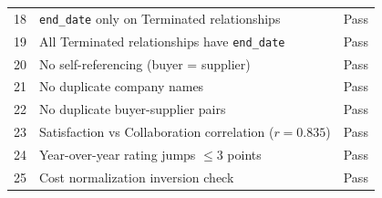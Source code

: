 \documentclass[11pt]{article}
\begin{document}
\begin{longtable}{clc}
18 & \texttt{end\_date} only on Terminated relationships & \textcolor{okgreen}{Pass} \\
19 & All Terminated relationships have \texttt{end\_date} & \textcolor{okgreen}{Pass} \\
20 & No self-referencing (buyer = supplier) & \textcolor{okgreen}{Pass} \\
21 & No duplicate company names & \textcolor{okgreen}{Pass} \\
22 & No duplicate buyer-supplier pairs & \textcolor{okgreen}{Pass} \\
23 & Satisfaction vs Collaboration correlation ($r = 0.835$) & \textcolor{okgreen}{Pass} \\
24 & Year-over-year rating jumps $\leq 3$ points & \textcolor{okgreen}{Pass} \\
25 & Cost normalization inversion check & \textcolor{okgreen}{Pass} \\
\bottomrule
\end{longtable}
\end{document}
